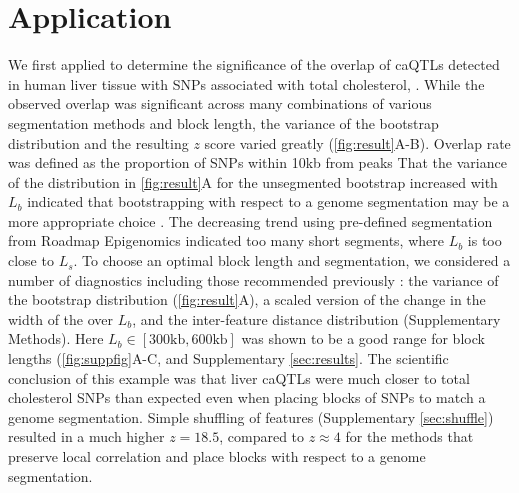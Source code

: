 \vspace*{-20pt}
\section{Application}

We first applied \bootranges to determine the significance of the
overlap of caQTLs detected in human liver tissue
\citep{CURRIN20211169} with SNPs associated with total cholesterol,
.
While the observed overlap was significant across many combinations of
various segmentation methods and block length, the variance of the
bootstrap distribution and the resulting $z$ score varied greatly
(\cref{fig:result}A-B). Overlap rate was defined as the proportion of
SNPs within 10kb from peaks 
That the variance of the distribution in \cref{fig:result}A for the
unsegmented bootstrap increased with $L_b$ indicated that
bootstrapping with respect to a genome
segmentation may be a more appropriate choice
\citep{bickel2010subsampling}. 
The decreasing trend using pre-defined segmentation from
Roadmap Epigenomics indicated too many short segments,
where $L_b$ is too close to $L_s$.
To choose an optimal block length and segmentation, 
we considered a number of diagnostics including
those recommended previously \citep{bickel2010subsampling}:
the variance of the bootstrap distribution (\cref{fig:result}A),
a scaled version of the change in the width of the
 over $L_b$,
and the inter-feature distance distribution (Supplementary Methods).
Here $L_b \in [300\textrm{kb},600\textrm{kb}]$ was shown to be a good range for block
lengths (\cref{fig:suppfig}A-C, and Supplementary \cref{sec:results}.
The scientific conclusion of this example was that liver caQTLs were
much closer to total cholesterol SNPs than expected even when placing
blocks of SNPs to match a genome segmentation.
Simple shuffling of features (Supplementary \cref{sec:shuffle})
resulted in a much higher $z = 18.5$, compared to $z \approx 4$ for
the methods that preserve local correlation and place blocks with
respect to a genome segmentation.

